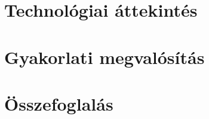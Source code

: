\documentclass[12pt, twosides]{report}
\begin{document}
\chapter{Technológiai áttekintés}






\chapter{Gyakorlati megvalósítás}


\chapter{Összefoglalás}





%
\end{document}
